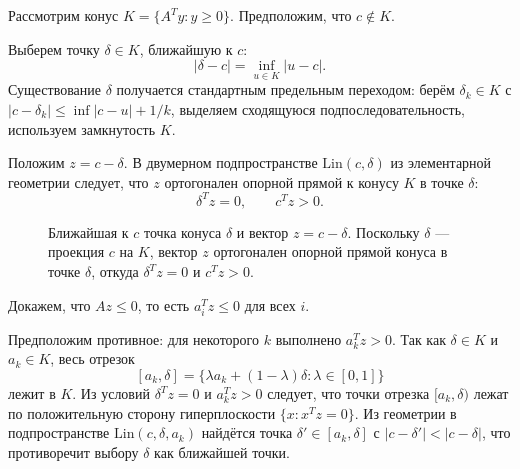 Рассмотрим конус $K = \{A^T y : y \ge 0\}$. Предположим, что $c \notin K$.

Выберем точку $\delta \in K$, ближайшую к $c$:
\[
|\delta - c| = \inf_{u \in K} |u - c|.
\]
Существование $\delta$ получается стандартным предельным переходом: берём $\delta_k \in K$ с $|c - \delta_k| \le \inf |c - u| + 1/k$, выделяем сходящуюся подпоследовательность, используем замкнутость $K$.

Положим $z = c - \delta$. В двумерном подпространстве $\mathrm{Lin}(c, \delta)$ из элементарной геометрии следует, что $z$ ортогонален опорной прямой к конусу $K$ в точке $\delta$:
\[
\delta^T z = 0, \qquad c^T z > 0.
\]

\begin{figure}[H]
	\centering
	\caption{Ближайшая к $c$ точка конуса $\delta$ и вектор $z=c-\delta$. Поскольку $\delta$ --- проекция $c$ на $K$, вектор $z$ ортогонален опорной прямой конуса в точке $\delta$, откуда $\delta^Tz=0$ и $c^Tz>0$.}
\end{figure}

Докажем, что $Az \le 0$, то есть $a_i^T z \le 0$ для всех $i$.

Предположим противное: для некоторого $k$ выполнено $a_k^T z > 0$. Так как $\delta \in K$ и $a_k \in K$, весь отрезок
\[
[a_k, \delta] = \{\lambda a_k + (1-\lambda)\delta : \lambda \in [0,1]\}
\]
лежит в $K$. Из условий $\delta^T z = 0$ и $a_k^T z > 0$ следует, что точки отрезка $[a_k, \delta)$ лежат по положительную сторону гиперплоскости $\{x : x^T z = 0\}$. Из геометрии в подпространстве $\mathrm{Lin}(c, \delta, a_k)$ найдётся точка $\delta' \in [a_k, \delta]$ с $|c - \delta'| < |c - \delta|$, что противоречит выбору $\delta$ как ближайшей точки.

